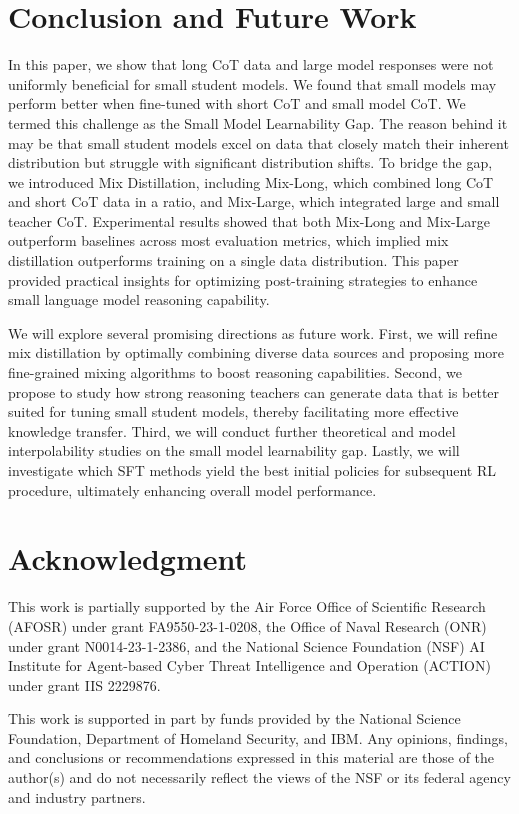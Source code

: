 \section{Conclusion and Future Work}
In this paper, we show that long CoT data and large model responses were not uniformly beneficial for small student models. We found that small models may perform better when fine-tuned with short CoT and small model CoT.
We termed this challenge as the Small Model Learnability Gap.
The reason behind it may be that small student models excel on data that closely match their inherent distribution but struggle with significant distribution shifts.  
To bridge the gap, we introduced Mix Distillation, including Mix-Long, which combined long CoT and short CoT data in a ratio, and Mix-Large, which integrated large and small teacher CoT. 
Experimental results showed that both Mix-Long and Mix-Large outperform baselines across most evaluation metrics, which implied mix distillation outperforms training on a single data distribution. This paper provided practical insights for optimizing post-training strategies to enhance small language model reasoning capability.

We will explore several promising directions as future work. First, we will refine mix distillation by optimally combining diverse data sources and proposing more fine-grained mixing algorithms to boost reasoning capabilities. Second, we propose to study how strong reasoning teachers can generate data that is better suited for tuning small student models, thereby facilitating more effective knowledge transfer. Third, we will conduct further theoretical and model interpolability studies on the small model learnability gap. Lastly, we will investigate which SFT methods yield the best initial policies for subsequent RL procedure, ultimately enhancing overall model performance.


\section*{Acknowledgment}


This work is partially supported by the Air Force Office of Scientific Research (AFOSR) under grant FA9550-23-1-0208, the Office of Naval Research (ONR) under grant N0014-23-1-2386, and the National Science Foundation (NSF) AI Institute for Agent-based Cyber Threat Intelligence and Operation (ACTION) under grant IIS 2229876.


This work is supported in part by funds provided by the National Science Foundation, Department of Homeland Security, and IBM. 
Any opinions, findings, and conclusions or recommendations expressed in this material are those of the author(s) and do not necessarily reflect the views of the NSF or its federal agency and industry partners.
